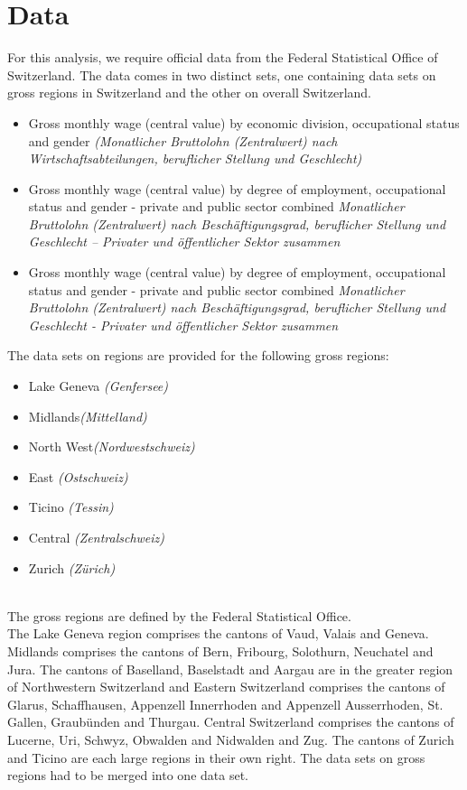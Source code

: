 \documentclass{article}
\begin{document}
\section{Data}

For this analysis, we require official data from the Federal Statistical Office of Switzerland. The data comes in two distinct sets, one containing data sets on gross regions in Switzerland and the other on overall Switzerland.

    \begin{itemize}
        \item  Gross monthly wage (central value) by economic division, occupational status and gender \textit{(Monatlicher Bruttolohn (Zentralwert) nach Wirtschaftsabteilungen, beruflicher Stellung und Geschlecht)}\cite{1}
        \item  Gross monthly wage (central value) by degree of employment, occupational status and gender - private and public sector combined \textit{Monatlicher Bruttolohn (Zentralwert) nach Beschäftigungsgrad, beruflicher Stellung und Geschlecht – Privater und öffentlicher Sektor zusammen} \cite{2}
        \item Gross monthly wage (central value) by degree of employment, occupational status and gender - private and public sector combined \textit{Monatlicher Bruttolohn (Zentralwert) nach Beschäftigungsgrad, beruflicher Stellung und Geschlecht - Privater und öffentlicher Sektor zusammen}\cite{3}
    \end{itemize}


The data sets on regions are provided for the following gross regions:
     \begin{itemize}
        \item Lake Geneva \textit{(Genfersee)}
        \item Midlands\textit{(Mittelland)}
        \item North West\textit{(Nordwestschweiz)}
        \item East \textit{(Ostschweiz)}
        \item Ticino \textit{(Tessin)}
        \item Central \textit{(Zentralschweiz)}
        \item Zurich \textit{(Zürich)}
    \end{itemize}
\\

The gross regions are defined by the Federal Statistical Office.\cite{1} \\
The Lake Geneva region comprises the cantons of Vaud, Valais and Geneva. Midlands comprises the cantons of Bern, Fribourg, Solothurn, Neuchatel and Jura. The cantons of Baselland, Baselstadt and Aargau are in the greater region of Northwestern Switzerland and Eastern Switzerland comprises the cantons of Glarus, Schaffhausen, Appenzell Innerrhoden and Appenzell Ausserrhoden, St. Gallen, Graubünden and Thurgau. Central Switzerland comprises the cantons of Lucerne, Uri, Schwyz, Obwalden and Nidwalden and Zug. The cantons of Zurich and Ticino are each large regions in their own right. The data sets on gross regions had to be merged into one data set.
\end{document}
